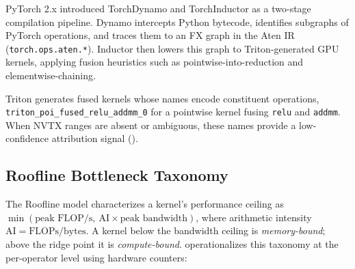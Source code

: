 PyTorch 2.x introduced TorchDynamo and TorchInductor \cite{pytorch2024} as a two-stage compilation
pipeline.  Dynamo intercepts Python bytecode, identifies subgraphs of PyTorch operations, and
traces them to an FX graph in the Aten IR (\texttt{torch.ops.aten.*}).  Inductor then lowers this
graph to Triton-generated GPU kernels, applying fusion heuristics such as pointwise-into-reduction
and elementwise-chaining.

Triton \cite{triton2019} generates fused kernels whose names encode constituent operations, \eg
\texttt{triton\_poi\_fused\_relu\_addmm\_0} for a pointwise kernel fusing \texttt{relu} and
\texttt{addmm}.  When NVTX ranges are absent or ambiguous, these names provide a low-confidence
attribution signal ().

\subsection{Roofline Bottleneck Taxonomy}
\label{sec:roofline}

The Roofline model \cite{williams2009roofline} characterizes a kernel's performance ceiling as
$\min(\text{peak FLOP/s},\ \text{AI} \times \text{peak bandwidth})$, where arithmetic intensity
$\text{AI} = \text{FLOPs} / \text{bytes}$.  A kernel below the bandwidth ceiling is
\emph{memory-bound}; above the ridge point it is \emph{compute-bound}.  \sys operationalizes this
taxonomy at the per-operator level using hardware counters:

